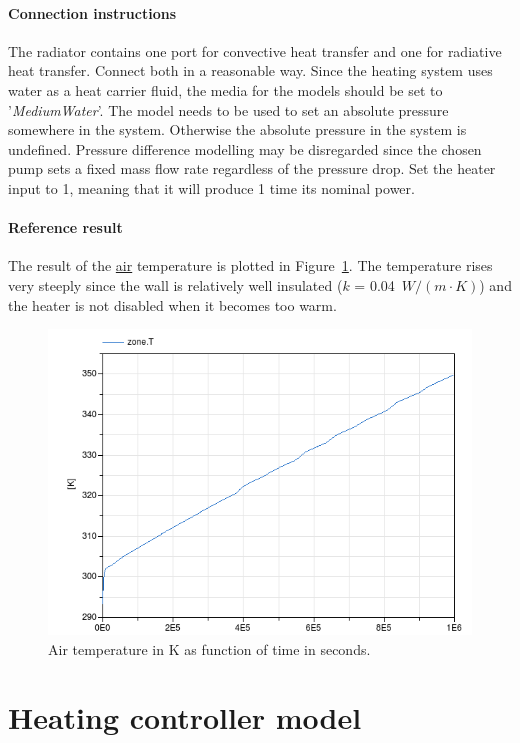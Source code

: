 \documentclass[10pt,a4paper]{article}
\begin{document}
\paragraph{Connection instructions}
The radiator contains one port for convective 
heat transfer and one for radiative heat transfer.
Connect both in a reasonable way.
Since the heating system uses water as a heat carrier fluid, 
the media for the models should be set to '\textit{MediumWater}'.
The  model needs to be used to set an absolute
pressure somewhere in the system. 
Otherwise the absolute 
pressure in the system is undefined.
Pressure difference modelling may be disregarded since the chosen pump
sets a fixed mass flow rate regardless of the pressure drop.
Set the heater input to 1, meaning that it will
produce 1 time its nominal power.


\paragraph{Reference result}
The result of the \underline{air} temperature 
is plotted in Figure~\ref{fig:res4}.
The temperature rises very steeply since the 
wall is relatively well insulated ($k$ = 0.04~$W/(m\cdot K)$)
and the heater is not disabled when it becomes too warm.



\begin{figure}
\centering
\includegraphics[scale=0.6]{result4.png}
\caption{Air temperature in K as function of time in seconds.}
\label{fig:res4}
\end{figure}


\section{Heating controller model}
\end{document}
